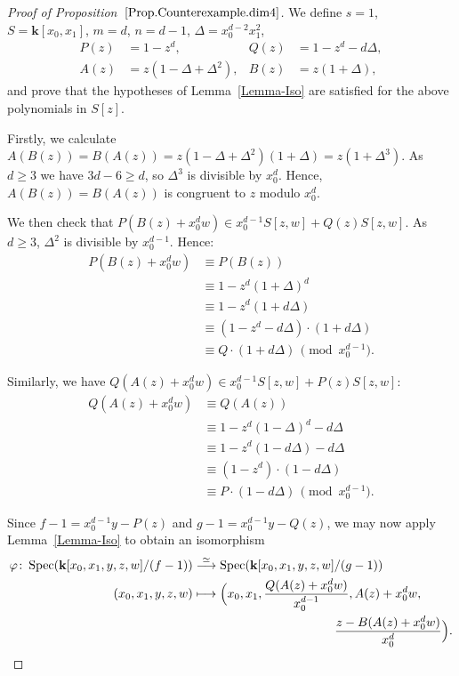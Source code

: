 \documentclass[JEP,XML,SOM,Unicode,NoFloatCountersInSection,published]{cedram}
\newcommand\mto{\mathchoice{\longmapsto}{\mapsto}{\mapsto}{\mapsto}}
\theoremstyle{definition}
\newcommand\iso{\stackrel{\simeq}{\longrightarrow}}
\renewcommand\k{{\mathbf k}}
\newcommand{\kk}{\mathbf{k}}
\DeclareMathOperator{\Spec}{Spec}
\begin{document}
\begin{proof}[Proof of Proposition~$\ref{Prop.Counterexample.dim4}$]
We define $s=1$, $S=\kk[x_0,x_1]$, $m=d$, $n=d-1$, $\Delta=x_0^{d-2}x_1^2$,
\begin{align*}
P(z) &=1-z^{d}, & Q(z) &=1-z^{d}-d\Delta,\\
A(z) &=z(1-\Delta+\Delta^2), & B(z) &=z(1+\Delta),
\end{align*}
and prove that the hypotheses of Lemma~\ref{Lemma-Iso} are satisfied for the above polynomials in $S[z]$.

Firstly, we calculate $A(B(z))=B(A(z))=z(1-\Delta+\Delta^2)(1+\Delta)=z(1+\Delta^3)$.
As $d \geq 3$ we have $3d-6\ge d$, so $\Delta^3$ is divisible by $x_0^d$.
Hence, $A(B(z))=B(A(z))$ is congruent to $z$ modulo $x_0^d$.

We then check that $P(B(z)+x_0^{d}w)\in x_0^{d-1}S[z,w]+Q(z)S[z,w]$. As $d\ge 3$, $\Delta^2$ is divisible by $x_0^{d-1}$. Hence:
\begin{align*}
P(B(z)+x_0^{d}w) &\equiv P(B(z))\\
&\equiv 1-z^d(1+\Delta)^{d} \\
&\equiv 1- z^d(1+d\Delta) \\
&\equiv(1-z^{d}-d\Delta)\cdot (1+d\Delta)\\
&\equiv Q\cdot (1+d\Delta)\, \pmod{x_0^{d-1}}.
\end{align*}

Similarly, we have
$Q(A(z)+x_0^{d}w)\in x_0^{d-1}S[z,w]+P(z)S[z,w]$:
\begin{align*}
Q(A(z)+x_0^{d}w) &\equiv Q(A(z))\\
& \equiv 1-z^d(1-\Delta)^d-d\Delta\\
& \equiv 1-z^d(1-d\Delta)-d\Delta\\
& \equiv (1-z^{d})\cdot (1-d\Delta)\\
&\equiv P\cdot (1-d\Delta)\, \pmod{x_0^{d-1}}.
\end{align*}

Since $f-1=x_0^{d-1}y-P(z)$ and $g-1=x_0^{d-1}y-Q(z)$, we may now apply Lemma~\ref{Lemma-Iso} to obtain an isomorphism
\begin{align*}
\varphi\colon\Spec(\k[x_0,x_1,y,z,w]/(f-1)) & \iso \Spec(\k[x_0,x_1,y,z,w]/(g-1)) \\
(x_0,x_1,y,z,w) & \mto \Bigl(x_0,x_1,\frac{Q(A(z)+x_0^{d}w)}{x_0^{d-1}},A(z)+x_0^{d}w, \\
&\hspace*{4cm}\frac{z-B(A(z)+x_0^{d}w)}{x_0^{d}}\Bigr).
\end{align*}


\end{proof}
\end{document}
